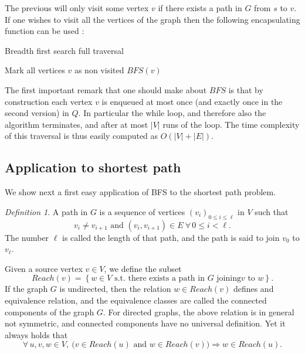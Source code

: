 \documentclass[12pt]{article}
\theoremstyle{plain}
\theoremstyle{remark}
\newtheorem*{definition}{Definition}
\begin{document}
The previous will only visit some vertex $v$ if there exists a path in $G$ from
$s$ to $v$. If one wishes to visit all the vertices of the graph then the following 
encapsulating function can be used :

\begin{algorithm}[H]
\caption{Breadth first search full traversal}
\begin{algorithmic}
	\State Mark all vertices $v$ as non visited
		$BFS(v)$
		\EndIf
	\EndFor
\EndFunction
\end{algorithmic}
\end{algorithm}

The first important remark that one should make about $BFS$ is that by construction
each vertex $v$ is enqueued at most once (and exactly once in the
second version) in $Q$. In particular the while loop, and therefore also the
algorithm terminates, and after at most $|V|$ runs of the loop. The time
complexity of this traversal is thus easily computed as $O(|V| + |E|)$.

\subsection{Application to shortest path}

We show next a first easy application of BFS to the shortest path problem.

\begin{definition}
A path in $G$ is a sequence of vertices $(v_i)_{0\leq i \leq \ell}$ 
in $V$ such that 
$$
	v_i \neq v_{i+1} \text{ and } (v_i,v_{i+1}) \in E\ \forall\, 0\leq i < \ell.
$$
The number $\ell$ is called the length of that path, and the path is said to
join $v_0$ to $v_\ell$.
\end{definition}

Given a source vertex $v \in V$, we define the subset
$$
Reach(v) = \left\{ w \in V \text{ s.t. there exists a path in } G \text{ joining
} v \text{ to } w\right\}.
$$
If the graph $G$ is undirected, then the relation $w \in Reach(v)$ defines and
equivalence relation, and the equivalence classes are called the connected
components of the graph $G$. For directed graphs, the above relation is in general
not symmetric, and connected components have no universal definition. Yet it
always holds that 
$$
\forall\, u,v,w \in V,\ \Big(v \in Reach(u) \text{ and } w \in Reach(v) \Big)
\Rightarrow w \in Reach(u).
$$
\end{document}
